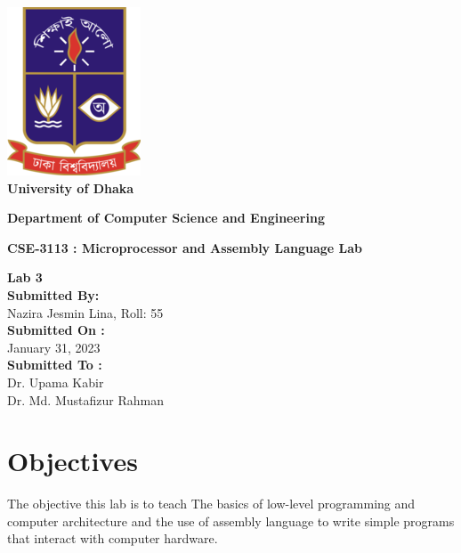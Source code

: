 \documentclass[11pt]{article}
\begin{document}
\begin{titlepage}
    \begin{center}
        \includegraphics[scale=0.9]{DU-log.png} \\[12pt]
        
        \huge \textbf{University of Dhaka}
        \begin{center}
           { \LARGE \textbf{Department of Computer Science and Engineering \\[8pt]}}
           
             {\textbf{ \LARGE CSE-3113 : Microprocessor and Assembly Language Lab\\[8pt]}}
                        
             \begin{LARGE}
                    \textbf{ \LARGE Lab 3\\[8pt]}
        		\textbf{Submitted By:\\[8pt]}
                         Nazira Jesmin Lina, Roll: 55\\[8pt]

        		\textbf{Submitted On : \\[8pt]}
        			January 31, 2023\\[10pt]
        		\textbf{Submitted To :\\[8pt]}
        			Dr. Upama Kabir\\[8pt]
                        Dr. Md. Mustafizur Rahman\\[8pt]
                    
	       \end{LARGE}
             
        \end{center}
    \end{center}
\end{titlepage}

\section{Objectives}
   The objective this lab is to teach The basics of low-level programming and computer architecture and the use of assembly language to write simple programs that interact with computer hardware.
\end{document}
